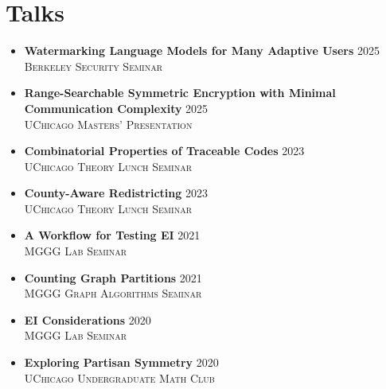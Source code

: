 \section*{Talks}

\begin{itemize}
    \item \textbf{Watermarking Language Models for Many Adaptive Users} \hfill 2025 \\ \textsc{Berkeley Security Seminar}
    \item \textbf{Range-Searchable Symmetric Encryption with Minimal Communication Complexity} \hfill 2025 \\\textsc{UChicago Masters' Presentation}
    \item \textbf{Combinatorial Properties of Traceable Codes} \hfill 2023 \\\textsc{UChicago Theory Lunch Seminar}
    \item \textbf{County-Aware Redistricting}  \hfill 2023 \\\textsc{UChicago Theory Lunch Seminar}
    \item \textbf{A Workflow for Testing EI} \hfill 2021 \\\textsc{MGGG Lab Seminar} 
    \item \textbf{Counting Graph Partitions} \hfill 2021 \\\textsc{MGGG Graph Algorithms Seminar} 
    \item \textbf{EI Considerations} \hfill 2020 \\\textsc{MGGG Lab Seminar} 
    \item \textbf{Exploring Partisan Symmetry} \hfill 2020 \\\textsc{UChicago Undergraduate Math Club} 
\end{itemize}




